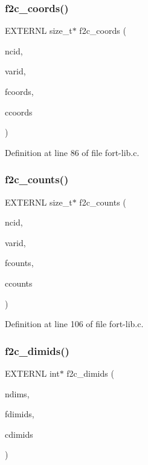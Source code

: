 \subsubsection{\texorpdfstring{f2c\+\_\+coords()}{f2c\_coords()}}
{\footnotesize\ttfamily E\+X\+T\+E\+R\+NL size\+\_\+t$\ast$ f2c\+\_\+coords (\begin{DoxyParamCaption}\item[{int}]{ncid,  }\item[{int}]{varid,  }\item[{const \hyperlink{ncfortran_8h_a0fd3f9e9fc30661142a1fb549af678e7}{N\+F\+\_\+\+I\+N\+T\+E\+G\+ER} $\ast$}]{fcoords,  }\item[{size\+\_\+t $\ast$}]{ccoords }\end{DoxyParamCaption})}



Definition at line 86 of file fort-\/lib.\+c.

\mbox{\label{fort-lib_8h_ae9f58d950cd1f1d82faf784c4db2c115}} 
\subsubsection{\texorpdfstring{f2c\+\_\+counts()}{f2c\_counts()}}
{\footnotesize\ttfamily E\+X\+T\+E\+R\+NL size\+\_\+t$\ast$ f2c\+\_\+counts (\begin{DoxyParamCaption}\item[{int}]{ncid,  }\item[{int}]{varid,  }\item[{const \hyperlink{ncfortran_8h_a0fd3f9e9fc30661142a1fb549af678e7}{N\+F\+\_\+\+I\+N\+T\+E\+G\+ER} $\ast$}]{fcounts,  }\item[{size\+\_\+t $\ast$}]{ccounts }\end{DoxyParamCaption})}



Definition at line 106 of file fort-\/lib.\+c.

\mbox{\label{fort-lib_8h_a57c6778d70be42b3e959ab2343790189}} 
\subsubsection{\texorpdfstring{f2c\+\_\+dimids()}{f2c\_dimids()}}
{\footnotesize\ttfamily E\+X\+T\+E\+R\+NL int$\ast$ f2c\+\_\+dimids (\begin{DoxyParamCaption}\item[{int}]{ndims,  }\item[{const \hyperlink{ncfortran_8h_a0fd3f9e9fc30661142a1fb549af678e7}{N\+F\+\_\+\+I\+N\+T\+E\+G\+ER} $\ast$}]{fdimids,  }\item[{int $\ast$}]{cdimids }\end{DoxyParamCaption})}



